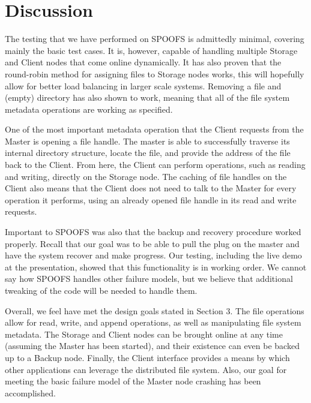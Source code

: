 \section{Discussion}
\label{sec:discussion}

The testing that we have performed on SPOOFS is admittedly minimal, covering mainly the basic test cases.  It is, however, capable of handling multiple Storage and Client nodes that come online dynamically.  It has also proven that the round-robin method for assigning files to Storage nodes works, this will hopefully allow for better load balancing in larger scale systems.  Removing a file and (empty) directory has also shown to work, meaning that all of the file system metadata operations are working as specified.  

One of the most important metadata operation that the Client requests from the Master is opening a file handle.  The master is able to successfully traverse its internal directory structure, locate the file, and provide the address of the file back to the Client.  From here, the Client can perform operations, such as reading and writing, directly on the Storage node.  The caching of file handles on the Client also means that the Client does not need to talk to the Master for every operation it performs, using an already opened file handle in its read and write requests.

Important to SPOOFS was also that the backup and recovery procedure worked properly.  Recall that our goal was to be able to pull the plug on the master and have the system recover and make progress.  Our testing, including the live demo at the presentation, showed that this functionality is in working order.  We cannot say how SPOOFS handles other failure models, but we believe that additional tweaking of the code will be needed to handle them.

Overall, we feel have met the design goals stated in Section 3.  The file operations allow for read, write, and append operations, as well as manipulating file system metadata.  The Storage and Client nodes can be brought online at any time (assuming the Master has been started), and their existence can even be backed up to a Backup node.  Finally, the Client interface provides a means by which other applications can leverage the distributed file system.  Also, our goal for meeting the basic failure model of the Master node crashing has been accomplished.

